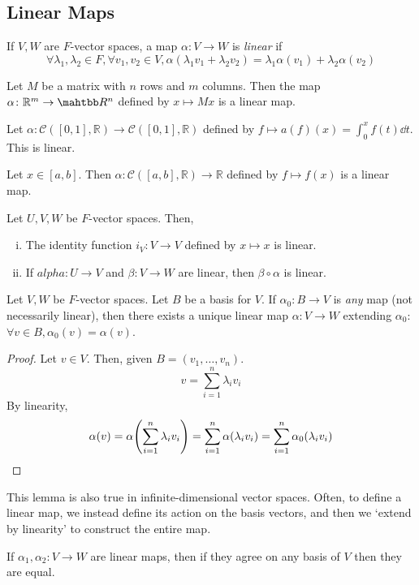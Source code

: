\subsection{Linear Maps}
\begin{definition}
    If \( V, W \) are \( F \)-vector spaces, a map \( \alpha \colon V \to W \) is \textit{linear} if
    \[ \forall \lambda_1, \lambda_2 \in F, \forall v_1, v_2 \in V, \alpha(\lambda_1 v_1 + \lambda_2 v_2) = \lambda_1 \alpha(v_1) + \lambda_2 \alpha(v_2) \]
\end{definition}
\begin{example}
    Let \( M \) be a matrix with \( n \) rows and \( m \) columns.
    Then the map \( \alpha \colon \mathbb R^m \to \mahtbb R^n \) defined by \( x \mapsto M x \) is a linear map.
\end{example}
\begin{example}
    Let \( \alpha \colon \mathcal C([0,1], \mathbb R) \to \mathcal C([0,1], \mathbb R) \) defined by \( f \mapsto a(f)(x) = \int_0^x f(t) \dd{t} \).
    This is linear.
\end{example}
\begin{example}
    Let \( x \in [a,b] \).
    Then \( \alpha \colon \mathcal C([a,b], \mathbb R) \to \mathbb R \) defined by \( f \mapsto f(x) \) is a linear map.
\end{example}
\begin{remark}
    Let \( U, V, W \) be \( F \)-vector spaces.
    Then,
    \begin{enumerate}[(i)]
        \item The identity function \( i_V \colon V \to V \) defined by \( x \mapsto x \) is linear.
        \item If \( alpha \colon U \to V \) and \( \beta \colon V \to W \) are linear, then \( \beta \circ \alpha \) is linear.
    \end{enumerate}
\end{remark}
\begin{lemma}
    Let \( V, W \) be \( F \)-vector spaces.
    Let \( B \) be a basis for \( V \).
    If \( \alpha_0 \colon B \to V \) is \textit{any} map (not necessarily linear), then there exists a unique linear map \( \alpha \colon V \to W \) extending \( \alpha_0 \): \( \forall v \in B, \alpha_0(v) = \alpha(v) \).
\end{lemma}
\begin{proof}
    Let \( v \in V \).
    Then, given \( B = (v_1, \dots, v_n) \).
    \[ v = \sum_{i=1}^n \lambda_i v_i \]
    By linearity,
    \[ \alpha(v) = \alpha\qty(\sum_{i=1}^n \lambda_i v_i) = \sum_{i=1}^n \alpha(\lambda_i v_i) = \sum_{i=1}^n \alpha_0(\lambda_i v_i) \]
\end{proof}
\begin{remark}
    This lemma is also true in infinite-dimensional vector spaces.
    Often, to define a linear map, we instead define its action on the basis vectors, and then we `extend by linearity' to construct the entire map.
\end{remark}
\begin{remark}
    If \( \alpha_1, \alpha_2 \colon V \to W \) are linear maps, then if they agree on any basis of \( V \) then they are equal.
\end{remark}

